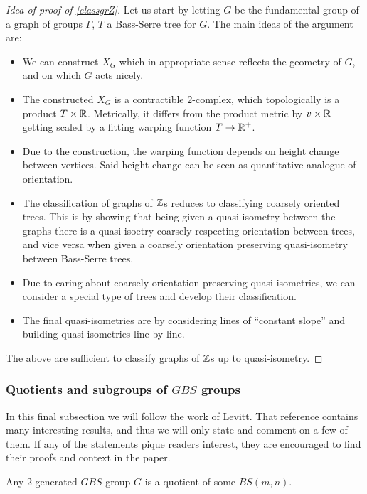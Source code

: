 \begin{proof}[Idea of proof of \ref{classgrZ}]
    Let us start by letting $G$ be the fundamental group of a graph of groups $\Gamma$, $T$ a Bass-Serre tree for $G$. The main ideas of the argument are:
    \begin{itemize}
        \item We can construct $X_G$ which in appropriate sense reflects the geometry of $G$, and on which $G$ acts nicely.
        \item The constructed $X_G$ is a contractible $2$-complex, which topologically is a product $T \times \mathbb{R}$. Metrically, it differs from the product metric by $v \times \mathbb{R}$ getting scaled by a fitting warping function $T \to \mathbb{R}^+$.
        \item Due to the construction, the warping function depends on height change between vertices. Said height change can be seen as quantitative analogue of orientation.
        \item The classification of graphs of $\mathbb{Z}$s reduces to classifying coarsely oriented trees. This is by showing that being given a quasi-isometry between the graphs there is a quasi-isoetry coarsely respecting orientation between trees, and vice versa when given a coarsely orientation preserving quasi-isometry between Bass-Serre trees.
        \item Due to caring about coarsely orientation preserving quasi-isometries, we can consider a special type of trees and develop their classification.
        \item The final quasi-isometries are by considering lines of ``constant slope'' and building quasi-isometries line by line.
    \end{itemize}
The above are sufficient to classify graphs of $\mathbb{Z}$s up to quasi-isometry.
\end{proof}


\subsubsection{Quotients and subgroups of $GBS$ groups} In this final subsection we will follow the work \cite{Le15} of Levitt. That reference contains many interesting results, and thus we will only state and comment on a few of them. If any of the statements pique readers interest, they are encouraged to find their proofs and context in the paper.

\begin{lemma}\cite[Lemma 2.1]{Le15}
    Any 2-generated $GBS$ group $G$ is a quotient of some $BS(m,n)$.
\end{lemma}

